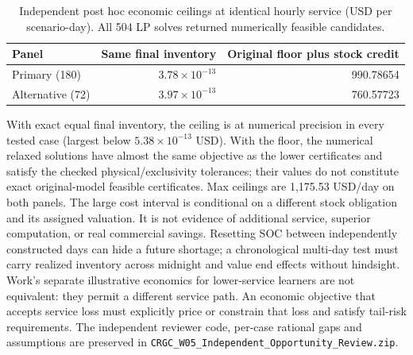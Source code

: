 \documentclass[11pt,letterpaper]{article}
\begin{document}
\begin{table}[htbp]\centering\small
\caption{Independent post hoc economic ceilings at identical hourly service (USD per scenario-day). All 504 LP solves returned numerically feasible candidates.}
\begin{tabularx}{\linewidth}{Y r r}\toprule
Panel & Same final inventory & Original floor plus stock credit\\\midrule
Primary (180) & $3.78\times10^{-13}$ & 990.78654\\
Alternative (72) & $3.97\times10^{-13}$ & 760.57723\\\bottomrule
\end{tabularx}
\end{table}
With exact equal final inventory, the ceiling is at numerical precision in every tested case (largest below $5.38\times10^{-13}$ USD). With the floor, the numerical relaxed solutions have almost the same objective as the lower certificates and satisfy the checked physical/exclusivity tolerances; their values do not constitute exact original-model feasible certificates. Max ceilings are 1,175.53 USD/day on both panels. The large cost interval is conditional on a different stock obligation and its assigned valuation. It is not evidence of additional service, superior computation, or real commercial savings. Resetting SOC between independently constructed days can hide a future shortage; a chronological multi-day test must carry realized inventory across midnight and value end effects without hindsight. Work's separate illustrative economics for lower-service learners are not equivalent: they permit a different service path. An economic objective that accepts service loss must explicitly price or constrain that loss and satisfy tail-risk requirements. The independent reviewer code, per-case rational gaps and assumptions are preserved in \texttt{CRGC\_W05\_Independent\_Opportunity\_Review.zip}.\cite{w05review}
\end{document}

